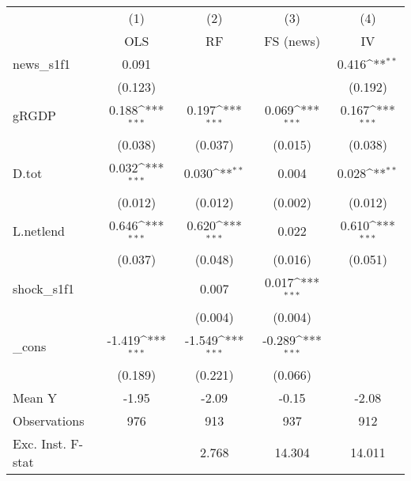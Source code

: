 {
\def\sym#1{\ifmmode^{#1}\else\(^{#1}\)\fi}
\begin{tabular}{l*{4}{c}}
\toprule
            &\multicolumn{1}{c}{(1)}&\multicolumn{1}{c}{(2)}&\multicolumn{1}{c}{(3)}&\multicolumn{1}{c}{(4)}\\
            &\multicolumn{1}{c}{OLS}&\multicolumn{1}{c}{RF}&\multicolumn{1}{c}{FS (news)}&\multicolumn{1}{c}{IV}\\
\midrule
news\_s1f1   &       0.091         &                     &                     &       0.416\sym{**} \\
            &     (0.123)         &                     &                     &     (0.192)         \\
\addlinespace
gRGDP       &       0.188\sym{***}&       0.197\sym{***}&       0.069\sym{***}&       0.167\sym{***}\\
            &     (0.038)         &     (0.037)         &     (0.015)         &     (0.038)         \\
\addlinespace
D.tot       &       0.032\sym{***}&       0.030\sym{**} &       0.004         &       0.028\sym{**} \\
            &     (0.012)         &     (0.012)         &     (0.002)         &     (0.012)         \\
\addlinespace
L.netlend   &       0.646\sym{***}&       0.620\sym{***}&       0.022         &       0.610\sym{***}\\
            &     (0.037)         &     (0.048)         &     (0.016)         &     (0.051)         \\
\addlinespace
shock\_s1f1  &                     &       0.007         &       0.017\sym{***}&                     \\
            &                     &     (0.004)         &     (0.004)         &                     \\
\addlinespace
\_cons      &      -1.419\sym{***}&      -1.549\sym{***}&      -0.289\sym{***}&                     \\
            &     (0.189)         &     (0.221)         &     (0.066)         &                     \\
\midrule
Mean Y      &       -1.95         &       -2.09         &       -0.15         &       -2.08         \\
Observations&         976         &         913         &         937         &         912         \\
Exc. Inst. F-stat&                     &       2.768         &      14.304         &      14.011         \\
\bottomrule
\end{tabular}
}
